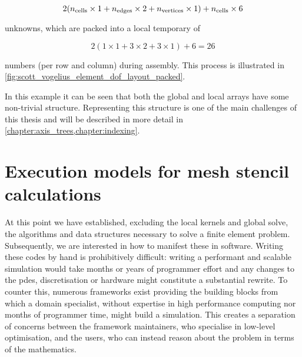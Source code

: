 \documentclass[thesis]{subfiles}
\begin{document}
\begin{equation*}
  2 ( n_\textnormal{cells} \times 1 + n_\textnormal{edges} \times 2 + n_\textnormal{vertices} \times 1 ) + n_\textnormal{cells} \times 6
\end{equation*}

unknowns, which are packed into a local temporary of

\begin{equation*}
  2 ( 1 \times 1 + 3 \times 2 + 3 \times 1 ) + 6 = 26
\end{equation*}

numbers (per row and column) during assembly.
This process is illustrated in \cref{fig:scott_vogelius_element_dof_layout_packed}.

In this example it can be seen that both the global and local arrays have some non-trivial structure.
Representing this structure is one of the main challenges of this thesis and will be described in more detail in \cref{chapter:axis_trees,chapter:indexing}.

\section{Execution models for mesh stencil calculations}






At this point we have established, excluding the local kernels and global solve, the algorithms and data structures necessary to solve a finite element problem.
Subsequently, we are interested in how to manifest these in software.
Writing these codes by hand is prohibitively difficult: writing a performant and scalable simulation would take months or years of programmer effort and any changes to the \glspl{pde}, discretisation or hardware might constitute a substantial rewrite.
To counter this, numerous frameworks exist providing the building blocks from which a domain specialist, without expertise in high performance computing nor months of programmer time, might build a simulation.
This creates a separation of concerns between the framework maintainers, who specialise in low-level optimisation, and the users, who can instead reason about the problem in terms of the mathematics.
\end{document}
